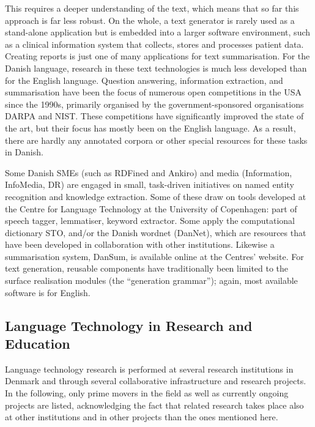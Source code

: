 \documentclass[]{../../metanetpaper}
\begin{document}
\begin{multicols}{2}

This requires a deeper understanding of the text, which means that so far this approach is far less robust. On the whole, a text generator is rarely used as a stand-alone application but is embedded into a larger software environment, such as a clinical information system that collects, stores and processes patient data. Creating reports is just one of many applications for text summarisation. 
For the Danish language, research in these text technologies is much less developed than for the Eng\-lish language. Question answering, information extraction, and summarisation have been the focus of numerous open competitions in the USA since the 1990s, primarily organised by the government-sponsored organisations DARPA and NIST. These competitions have significantly improved the state of the art, but their focus has mostly been on the English language. As a result, there are hardly any annotated corpora or other special resources for these tasks in Danish. 

Some Danish SMEs (such as RDFined and Ankiro) and media (Information, InfoMedia, DR) 
are engaged in small, task-driven initiatives on named entity recognition and knowledge extraction.  Some of these draw on tools developed at the Centre for Language Technology at the University of Copenhagen: part of speech tagger, lemmatiser, keyword extractor.  Some apply the computational dictionary STO, and/or the Danish wordnet (DanNet), which are resources that have been developed in collaboration with other institutions. Likewise a summarisation system, DanSum, is available online at the Centres' website.  For text generation, reusable components have traditionally been limited to the surface realisation modules (the “generation grammar”); again, most available software is for English. 


\subsection{Language Technology in Research and Education}

  Language technology research is performed at several research institutions in Denmark and through several collaborative infrastructure and research projects. In the following, only prime movers in the field as well as currently ongoing projects are listed, acknowledging the fact that related research takes place also at other institutions and in other projects than the ones mentioned here.


\end{multicols}
\end{document}
